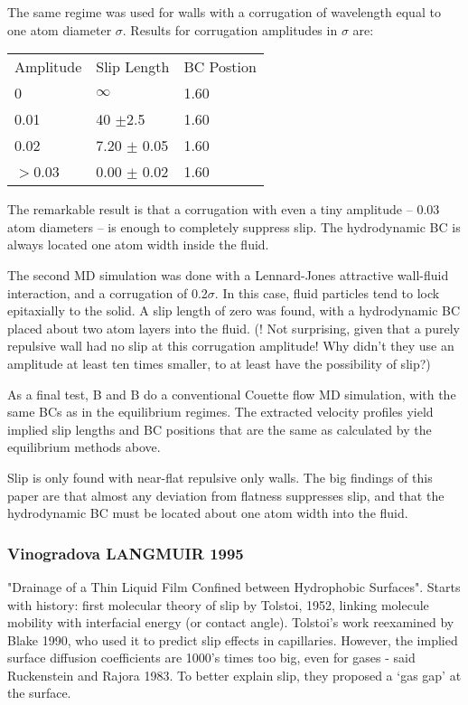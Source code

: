 \documentclass[twocolumn]{article}
\begin{document}
The same regime was used for walls with a corrugation of wavelength equal to one atom diameter $\sigma$. Results for corrugation amplitudes in $\sigma$ are: 

\vspace*{0.5em}
\begin{tabular}{l l l}
Amplitude   & Slip Length      & BC Postion \\

   0        & $\infty$         & 1.60 \\
   0.01     & 40 $\pm$2.5      & 1.60 \\
   0.02     & 7.20 $\pm$ 0.05  & 1.60 \\
$>$0.03     & 0.00 $\pm$ 0.02  & 1.60 \\

\end{tabular} 

\vspace*{0.5em}
The remarkable result is that a corrugation with even a tiny amplitude -- 0.03 atom diameters -- is enough to completely suppress slip.  The hydrodynamic BC is always located one atom width inside the fluid.

The second MD simulation was done with a Lennard-Jones attractive wall-fluid interaction, and a corrugation of 0.2$\sigma$. In this case, fluid particles tend to lock epitaxially to the solid.  A slip length of zero was found, with a hydrodynamic BC placed about two atom layers into the fluid.  (! Not surprising, given that a purely repulsive wall had no slip at this corrugation amplitude!  Why didn't they use an amplitude at least ten times smaller, to at least have the possibility of slip?)

As a final test, B and B do a conventional Couette flow MD simulation, with the same BCs as in the equilibrium regimes.  The extracted velocity profiles yield implied slip lengths and BC positions that are the same as calculated by the equilibrium methods above.

Slip is only found with near-flat repulsive only walls.  The big findings of this paper are that almost any deviation from flatness suppresses slip, and that the hydrodynamic BC must be located about one atom width into the fluid.

 


\subsubsection*{Vinogradova LANGMUIR 1995}
"Drainage of a Thin Liquid Film Confined between Hydrophobic Surfaces". Starts with history: first molecular theory of slip by Tolstoi, 1952, linking molecule mobility with interfacial energy (or contact angle). Tolstoi's work reexamined by Blake 1990, who used it to predict slip effects in capillaries.  However, the implied surface diffusion coefficients are 1000's times too big, even for gases - said Ruckenstein and Rajora 1983. To better explain slip, they proposed a `gas gap' at the surface.
\end{document}
